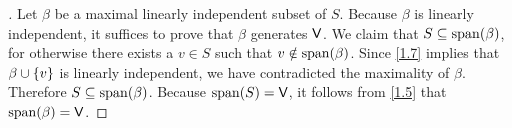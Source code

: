\begin{proof}[]
  Let \(\beta\) be a maximal linearly independent subset of \(S\).
  Because \(\beta\) is linearly independent, it suffices to prove that \(\beta\) generates \(\mathsf{V}\).
  We claim that \(S \subseteq \spn{\beta}\), for otherwise there exists a \(v \in S\) such that \(v \notin \spn{\beta}\).
  Since \cref{1.7} implies that \(\beta \cup \left\lbrace v\right\rbrace\) is linearly independent, we have contradicted the maximality of \(\beta\).
  Therefore \(S \subseteq \spn{\beta}\).
  Because \(\spn{S} = \V\), it follows from \cref{1.5} that \(\spn{\beta} = \V\).
\end{proof}
